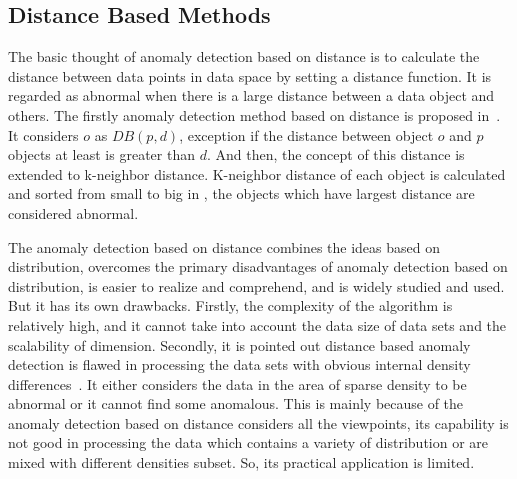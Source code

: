 \subsection{Distance Based Methods}

The basic thought of anomaly detection based on
distance is to calculate the distance between data points in
data space by setting a distance function.
It is regarded as
abnormal when there is a large distance between a data
object and others.
The  firstly anomaly detection method 
based on distance is proposed in~\cite{knorr1997unified}.
It considers $o$ as $DB(p,d)$,
exception if the distance between object $o$ and
$p$ objects at least is greater than $d$.
And then,
the concept of this distance is extended to k-neighbor distance.
K-neighbor distance of each object is calculated and
sorted from small to big in \cite{ramaswamy2000efficient},
the objects which have largest
distance are considered abnormal.

The anomaly detection based on distance combines the ideas
based on distribution,
overcomes the primary disadvantages
of anomaly detection based on distribution,
is easier to realize and comprehend,
and is widely studied and used.
But it has its own drawbacks.
Firstly,
the complexity of the algorithm is relatively high,
and it cannot take into account
the data size of data sets and the scalability of dimension.
Secondly,
it is pointed out distance based anomaly detection is flawed in
processing the data sets with obvious internal density
differences~\cite{breunig2000lof}.
It either considers the data in the area of sparse
density to be abnormal or
it cannot find some anomalous.
This is mainly because of the anomaly detection based on
distance considers all the viewpoints,
its capability is not good in processing the data which
contains a variety of distribution or
are mixed with different densities subset.
So,
its practical application is limited.


